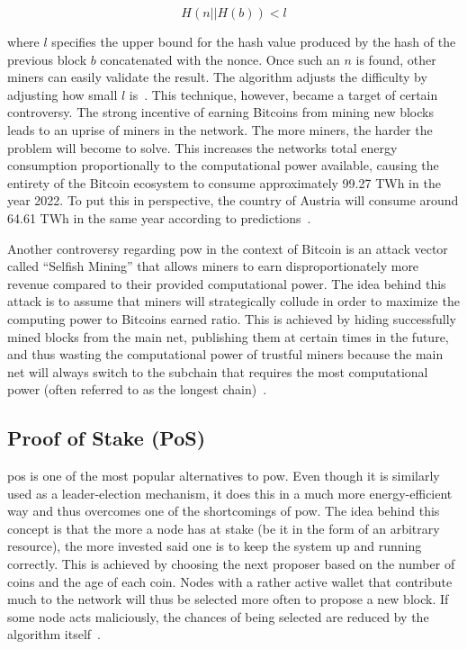 \begin{equation}
H(n || H(b)) < l
\end{equation}

where $l$ specifies the upper bound for the hash value produced by the hash of the previous block $b$ concatenated with the nonce. Once such an $n$ is found, other miners can easily validate the result. The algorithm adjusts the difficulty by adjusting how small $l$ is~\cite{consensus_comparison_2019}. This technique, however, became a target of certain controversy. The strong incentive of earning Bitcoins from mining new blocks leads to an uprise of miners in the network. The more miners, the harder the problem will become to solve. This increases the networks total energy consumption proportionally to the computational power available, causing the entirety of the Bitcoin ecosystem to consume approximately 99.27 TWh in the year 2022. To put this in perspective, the country of Austria will consume around 64.61 TWh in the same year according to predictions~\cite{cbeci}.

Another controversy regarding \gls{pow} in the context of Bitcoin is an attack vector called ``Selfish Mining'' that allows miners to earn disproportionately more revenue compared to their provided computational power. The idea behind this attack is to assume that miners will strategically collude in order to maximize the computing power to Bitcoins earned ratio. This is achieved by hiding successfully mined blocks from the main net, publishing them at certain times in the future, and thus wasting the computational power of trustful miners because the main net will always switch to the subchain that requires the most computational power (often referred to as the longest chain)~\cite{eyal2013}.


\subsection{Proof of Stake (PoS)}
\label{sec:background:pos}
\gls{pos} is one of the most popular alternatives to \gls{pow}. Even though it is similarly used as a leader-election mechanism, it does this in a much more energy-efficient way and thus overcomes one of the shortcomings of \gls{pow}. The idea behind this concept is that the more a node has at stake (be it in the form of an arbitrary resource), the more invested said one is to keep the system up and running correctly. This is achieved by choosing the next proposer based on the number of coins and the age of each coin. Nodes with a rather active wallet that contribute much to the network will thus be selected more often to propose a new block. If some node acts maliciously, the chances of being selected are reduced by the algorithm itself~\cite{consensus_comparison_2019}.


